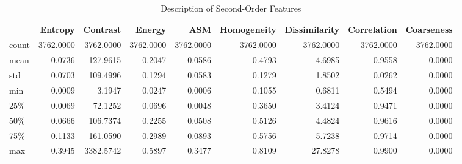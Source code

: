 \documentclass{article}
\begin{document}
\begin{table}[H]
    \centering
    \footnotesize
    \begin{tabular}{lrrrrrrrr}
    \toprule
     & Entropy & Contrast & Energy & ASM & Homogeneity & Dissimilarity & Correlation & Coarseness \\
    \midrule
    count & 3762.0000 & 3762.0000 & 3762.0000 & 3762.0000 & 3762.0000 & 3762.0000 & 3762.0000 & 3762.0000 \\
    mean & 0.0736 & 127.9615 & 0.2047 & 0.0586 & 0.4793 & 4.6985 & 0.9558 & 0.0000 \\
    std & 0.0703 & 109.4996 & 0.1294 & 0.0583 & 0.1279 & 1.8502 & 0.0262 & 0.0000 \\
    min & 0.0009 & 3.1947 & 0.0247 & 0.0006 & 0.1055 & 0.6811 & 0.5494 & 0.0000 \\
    25\% & 0.0069 & 72.1252 & 0.0696 & 0.0048 & 0.3650 & 3.4124 & 0.9471 & 0.0000 \\
    50\% & 0.0666 & 106.7374 & 0.2255 & 0.0508 & 0.5126 & 4.4824 & 0.9616 & 0.0000 \\
    75\% & 0.1133 & 161.0590 & 0.2989 & 0.0893 & 0.5756 & 5.7238 & 0.9714 & 0.0000 \\
    max & 0.3945 & 3382.5742 & 0.5897 & 0.3477 & 0.8109 & 27.8278 & 0.9900 & 0.0000 \\
    \bottomrule
    \end{tabular}
    \caption{Description of Second-Order Features}
    \label{so-features}
\end{table}
\end{document}
